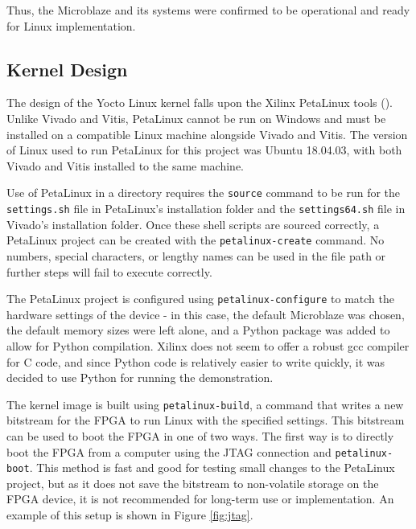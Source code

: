 \documentclass{article}
\begin{document}
Thus, the Microblaze and its systems were confirmed to be operational and ready for Linux implementation.\par

\subsection{Kernel Design}
The design of the Yocto Linux kernel falls upon the Xilinx PetaLinux tools (\cite{petalinux-command}). Unlike Vivado and Vitis, PetaLinux cannot be run on Windows and must be installed on a compatible Linux machine alongside Vivado and Vitis. The version of Linux used to run PetaLinux for this project was Ubuntu 18.04.03, with both Vivado and Vitis installed to the same machine.\par
Use of PetaLinux in a directory requires the \texttt{source} command to be run for the \texttt{settings.sh} file in PetaLinux's installation folder and the \texttt{settings64.sh} file in Vivado's installation folder. Once these shell scripts are sourced correctly, a PetaLinux project can be created with the \texttt{petalinux-create} command. No numbers, special characters, or lengthy names can be used in the file path or further steps will fail to execute correctly.\par
The PetaLinux project is configured using \texttt{petalinux-configure} to match the hardware settings of the device - in this case, the default Microblaze was chosen, the default memory sizes were left alone, and a Python package was added to allow for Python compilation. Xilinx does not seem to offer a robust gcc compiler for C code, and since Python code is relatively easier to write quickly, it was decided to use Python for running the demonstration.\par
The kernel image is built using \texttt{petalinux-build}, a command that writes a new bitstream for the FPGA to run Linux with the specified settings. This bitstream can be used to boot the FPGA in one of two ways. The first way is to directly boot the FPGA from a computer using the JTAG connection and \texttt{petalinux-boot}. This method is fast and good for testing small changes to the PetaLinux project, but as it does not save the bitstream to non-volatile storage on the FPGA device, it is not recommended for long-term use or implementation. An example of this setup is shown in Figure \ref{fig:jtag}.\par
\end{document}
